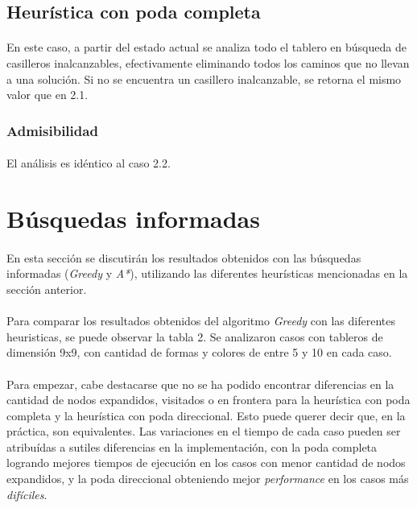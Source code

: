 \documentclass[12pt, twocolumn]{article}
\begin{document}
	\subsection{Heurística con poda completa}
	
	\paragraph{} En este caso, a partir del estado actual se analiza todo el tablero en búsqueda de casilleros inalcanzables, efectivamente eliminando todos los caminos que no llevan a una solución. Si no se encuentra un casillero inalcanzable, se retorna el mismo valor que en 2.1.
	
	\subsubsection{Admisibilidad}
	
	\paragraph{} El análisis es idéntico al caso 2.2.
	
	\section{Búsquedas informadas}
	
	\paragraph{} En esta sección se discutirán los resultados obtenidos con las búsquedas informadas (\textit{Greedy} y \textit{A*}), utilizando las diferentes heurísticas mencionadas en la sección anterior. 
    
    \paragraph{}Para comparar los resultados obtenidos del algoritmo \textit{Greedy} con las diferentes heuristicas,
se puede observar la tabla 2. Se analizaron casos con tableros de dimensión 9x9, con cantidad de formas y colores de entre 5 y 10 en cada caso. 

\paragraph{}Para empezar, cabe destacarse que no se ha podido encontrar diferencias en la cantidad de nodos expandidos, visitados
o en frontera para la heurística con poda completa y la heurística con 
poda direccional. Esto puede querer decir que, en la práctica, son equivalentes. Las variaciones en el tiempo de cada caso pueden ser atribuídas a sutiles diferencias en la implementación, con la poda completa logrando mejores tiempos de ejecución en los casos con menor cantidad de nodos expandidos, y la poda direccional obteniendo mejor \textit{performance} en los casos más \textit{difíciles}.
\end{document}
